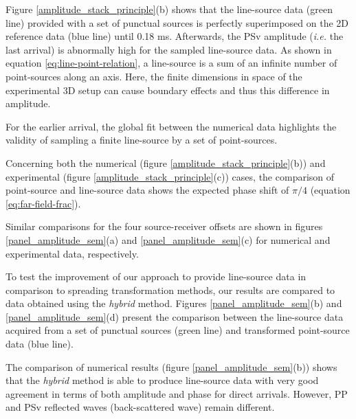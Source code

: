 \documentclass[manuscript,revised]{geophysics}
\begin{document}
\noindent Figure \ref{amplitude_stack_principle}(b) shows that the line-source data (green line) provided with a set of punctual sources is perfectly superimposed on the 2D reference data (blue line) until 0.18 ms. Afterwards, the PSv amplitude (\textit{i.e.} the last arrival) is abnormally high for the sampled line-source data. As shown in equation \ref{eq:line-point-relation}, a line-source is a sum of an infinite number of point-sources along an axis. Here, the finite dimensions in space of the experimental 3D setup can cause boundary effects and thus this difference in amplitude.

\noindent For the earlier arrival, the global fit between the numerical data highlights the validity of sampling a finite line-source by a set of point-sources.

\noindent Concerning both the numerical (figure \ref{amplitude_stack_principle}(b)) and experimental (figure \ref{amplitude_stack_principle}(c)) cases, the comparison of point-source and line-source data shows the expected phase shift of $\pi/4$ (equation \ref{eq:far-field-frac}).

\noindent Similar comparisons for the four source-receiver offsets are shown in figures \ref{panel_amplitude_sem}(a) and \ref{panel_amplitude_sem}(c) for numerical and experimental data, respectively.

\noindent To test the improvement of our approach to provide line-source data in comparison to spreading transformation methods, our results are compared to data obtained using the \textit{hybrid} method. Figures \ref{panel_amplitude_sem}(b) and \ref{panel_amplitude_sem}(d) present the comparison between the line-source data acquired from a set of punctual sources (green line) and transformed point-source data (blue line).

\noindent The comparison of numerical results (figure \ref{panel_amplitude_sem}(b)) shows that the \textit{hybrid} method is able to produce line-source data with very good agreement in terms of both amplitude and phase for direct arrivals. However, PP and PSv reflected waves (back-scattered wave) remain different.
\end{document}
